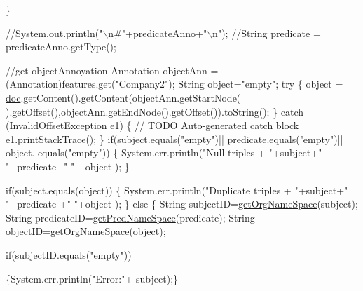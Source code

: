 \begin{DoxyCode}
            \}


            \textcolor{comment}{//System.out.println("\(\backslash\)n#"+predicateAnno+"\(\backslash\)n");}
            \textcolor{comment}{//String predicate = predicateAnno.getType();}

            \textcolor{comment}{//get objectAnnoyation}
            Annotation objectAnn = (Annotation)features.get(\textcolor{stringliteral}{"Company2"});
            String \textcolor{keywordtype}{object}=\textcolor{stringliteral}{"empty"};
            \textcolor{keywordflow}{try} \{
                \textcolor{keywordtype}{object} = \hyperlink{class_h_l_t_tutorial_adc313cb5e485ec03e21897d5c0132591}{doc}.getContent().getContent(objectAnn.getStartNode(
      ).getOffset(),objectAnn.getEndNode().getOffset()).toString();
            \} \textcolor{keywordflow}{catch} (InvalidOffsetException e1) \{
                \textcolor{comment}{// TODO Auto-generated catch block}
                e1.printStackTrace();
            \}
            \textcolor{keywordflow}{if}(subject.equals(\textcolor{stringliteral}{"empty"})|| predicate.equals(\textcolor{stringliteral}{"empty"})|| \textcolor{keywordtype}{object}.
      equals(\textcolor{stringliteral}{"empty"}))
            \{
                System.err.println(\textcolor{stringliteral}{"Null triples + "}+subject+\textcolor{stringliteral}{" "}+predicate+\textcolor{stringliteral}{" "}+\textcolor{keywordtype}{
      object} );
            \}

            \textcolor{keywordflow}{if}(subject.equals(\textcolor{keywordtype}{object}))
            \{
                System.err.println(\textcolor{stringliteral}{"Duplicate triples + "}+subject+\textcolor{stringliteral}{" "}+predicate
      +\textcolor{stringliteral}{" "}+\textcolor{keywordtype}{object} );
            \}
            \textcolor{keywordflow}{else}
            \{   
                String subjectID=\hyperlink{class_h_l_t_tutorial_a81baeb2bb51fe4720470dabfb269b102}{getOrgNameSpace}(subject);
                String predicateID=\hyperlink{class_h_l_t_tutorial_a367a2190f2398ea406657d63fe2b4965}{getPredNameSpace}(predicate);
                String objectID=\hyperlink{class_h_l_t_tutorial_a81baeb2bb51fe4720470dabfb269b102}{getOrgNameSpace}(\textcolor{keywordtype}{object});


                \textcolor{keywordflow}{if}(subjectID.equals(\textcolor{stringliteral}{"empty"}))

                \{System.err.println(\textcolor{stringliteral}{"Error:"}+ subject);\}


\end{DoxyCode}
